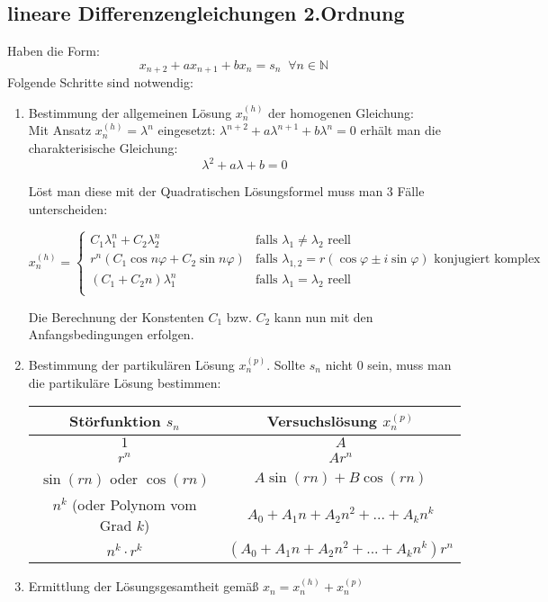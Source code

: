 \subsection{lineare Differenzengleichungen 2.Ordnung}
Haben die Form:
\[x_{n+2}+ax_{n+1}+bx_n=s_n\;\;\forall n\in\mathbb N\]
Folgende Schritte sind notwendig:
\begin{enumerate}[1)]
\item Bestimmung der allgemeinen Lösung $x_n^{(h)}$ der homogenen Gleichung:\\
    Mit Ansatz $x_n^{(h)}=\lambda^n$ eingesetzt: $\lambda^{n+2}+a\lambda^{n+1}+b\lambda^n=0$ erhält man die charakterisische Gleichung:
    \[\lambda^2+a\lambda+b=0\]

    Löst man diese mit der Quadratischen Lösungsformel muss man 3 Fälle unterscheiden:

    \[
        x_n^{(h)} = \begin{cases} 
                C_1\lambda_1^n+C_2\lambda_2^n &\mbox{falls } \lambda_1 \neq \lambda_2 \mbox{ reell} \\
                r^n(C_1\cos n\varphi+C_2\sin n\varphi) &\mbox{falls } \lambda_{1,2} = r(\cos\varphi\pm i\sin\varphi)\mbox{ konjugiert komplex} \\
                (C_1+C_2n)\lambda_1^n &\mbox{falls } \lambda_1 = \lambda_2 \mbox{ reell} \\
            \end{cases}
    \]

    Die Berechnung der Konstenten $C_1$ bzw. $C_2$ kann nun mit den Anfangsbedingungen erfolgen.

\item Bestimmung der partikulären Lösung $x_n^{(p)}$.
    Sollte $s_n$ nicht $0$ sein, muss man die partikuläre Lösung bestimmen:
    \begin{center}
    \begin{tabular}{|c|c|}
        \hline
        Störfunktion $s_n$ & Versuchslösung $x_n^{(p)}$\\
        \hline
        $1$ & $A$\\
        $r^n$ & $Ar^n$\\
        $\sin(rn)$ oder $\cos(rn)$ & $A\sin(rn)+B\cos(rn)$\\
        $n^k$ (oder Polynom vom Grad $k$) & $A_0+A_1n+A_2n^2+...+A_kn^k$\\
        $n^k\cdot r^k$ & $(A_0+A_1n+A_2n^2+...+A_kn^k)r^n$\\
        \hline
    \end{tabular}
    \end{center}
\item Ermittlung der Lösungsgesamtheit gemäß $x_n=x_n^{(h)}+x_n^{(p)}$
\end{enumerate}

